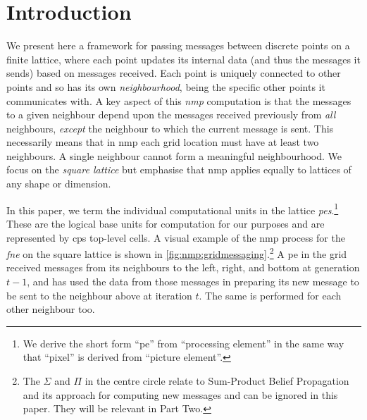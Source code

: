 \section{Introduction}
We present here a framework for passing messages between discrete points on a finite lattice, where each point updates its internal data (and thus the messages it sends) based on messages received.  Each point is uniquely connected to other points and so has its own \emph{neighbourhood}, being the specific other points it communicates with.  A key aspect of this \emph{\gls{nmp}} computation is that the messages to a given neighbour depend upon the messages received previously from \emph{all} neighbours, \emph{except} the neighbour to which the current message is sent.    This necessarily means that in \gls{nmp} each grid location must have at least two neighbours.  A single neighbour cannot form a meaningful neighbourhood.  We focus on the \emph{square lattice} but emphasise that \gls{nmp} applies equally to lattices of any shape or dimension.

In this paper, we term the individual computational units in the lattice \emph{\glspl{pe}}.\footnote{We derive the short form ``\gls{pe}'' from ``processing element'' in the same way that ``pixel'' is derived from ``picture element''.}  These are the logical base units for computation for our purposes and are represented by \gls{cps} top-level cells.  A visual example of the \gls{nmp} process for the \emph{\gls{fne}} on the square lattice is shown in \autoref{fig:nmp:gridmessaging}.\footnote{The \(\Sigma\) and \(\Pi\) in the centre circle relate to Sum-Product Belief Propagation and its approach for computing new messages and can be ignored in this paper.  They will be relevant in Part Two.}  A \gls{pe} in the grid received messages from its neighbours to the left, right, and bottom at generation \(t - 1\), and has used the data from those messages in preparing its new message to be sent to the neighbour above at iteration \(t\).  The same is performed for each other neighbour too.

